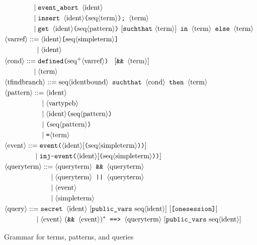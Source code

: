 \begin{figure}
\begin{align*}
&\pht \texttt{event\string_abort }\nonterm{ident}\\
&\pht \texttt{insert }\nonterm{ident}\texttt{(}\seq{term}\texttt{)}\texttt{; }\nonterm{term}\\
&\pht \texttt{get }\nonterm{ident}\texttt{(}\seq{pattern}\texttt{)}\ [\texttt{suchthat}\ \nonterm{term}]\texttt{ in }\nonterm{term}\texttt{ else }\nonterm{term}\\
&\nonterm{varref} ::= \nonterm{ident}\texttt{[}\seq{simpleterm}\texttt{]}\\
&\phantom{\nonterm{varref} =}\mid \nonterm{ident}\\
&\nonterm{cond} ::= \texttt{defined(} \neseq{varref} \texttt{) }\ [\texttt{\&\& }\nonterm{term}]\\
&\phantom{\nonterm{cond} = }\mid \nonterm{term}\\
&\nonterm{tfindbranch} ::= \seq{identbound} \texttt{ suchthat } \nonterm{cond} \texttt{ then }\nonterm{term}\\
&\nonterm{pattern} ::= \nonterm{ident}\\
&\phpat \nonterm{vartypeb}\\
&\phpat \nonterm{ident}\texttt{(} \seq{pattern}\texttt{)}\\
&\phpat \texttt{(} \seq{pattern}\texttt{)}\\
&\phpat \texttt{=} \nonterm{term}\\
&\nonterm{event} ::= \texttt{event(}\nonterm{ident}[\texttt{(}\seq{simpleterm}\texttt{))}]\\
&\phantom{\nonterm{event} =}\mid \texttt{inj-event(}\nonterm{ident}[\texttt{(}\seq{simpleterm}\texttt{))}]\\
&\nonterm{queryterm} ::= \nonterm{queryterm}\texttt{ \&\& }\nonterm{queryterm}\\
&\phqt \nonterm{queryterm}\texttt{ || }\nonterm{queryterm}\\
&\phqt \nonterm{event}\\
&\phqt \nonterm{simpleterm}\\
&\nonterm{query} ::= \texttt{secret }\nonterm{ident}\ [\texttt{public\_vars}\ \seq{ident}]\ [\texttt{[onesession]}]\\
&\phq \nonterm{event}\ (\texttt{\&\& }\nonterm{event})^* \texttt{ ==> }\nonterm{queryterm}\ [\texttt{public\_vars}\ \seq{ident}]
\end{align*}
\caption{Grammar for terms, patterns, and queries}
\label{fig:syntax1}
\end{figure}

